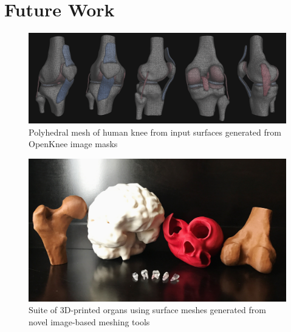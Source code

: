 \chapter{Future Work}

\begin{figure}[ht]
\centering
		\includegraphics[width=1.0\textwidth]{media/7-polyknee/fullmesh.png}
%
\caption{Polyhedral mesh of human knee from input surfaces generated from OpenKnee image masks}
\label{fig:polyknee}
\end{figure}

\begin{figure}[ht]
\centering
		\includegraphics[width=1.0\textwidth]{media/6-3dprint/3dprint.jpg}
%
\caption{Suite of 3D-printed organs using surface meshes generated from novel image-based meshing tools}
\label{fig:3dprint}
\end{figure}

